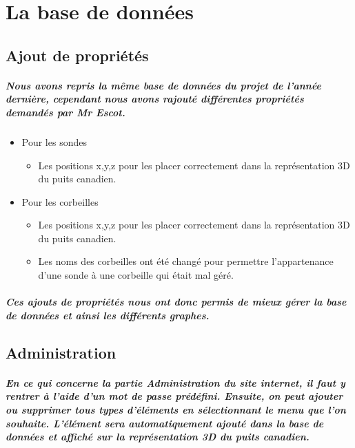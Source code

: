 \documentclass[12pt , a4paper,titlepage]{report}
\begin{document}
 \chapter{La base de données}
 \section{Ajout de propriétés}
 
 \paragraph{ Nous avons repris la même base de données du projet de l'année dernière, cependant nous avons rajouté différentes propriétés demandés 
par Mr Escot.}
	\begin{itemize}
		\item Pour les sondes
		\begin{itemize}
			\item Les positions x,y,z pour les placer correctement dans la représentation 3D du puits canadien.
		\end{itemize}
		\item Pour les corbeilles
		\begin{itemize}
			\item Les positions x,y,z pour les placer correctement dans la représentation 3D du puits canadien.
			\item Les noms des corbeilles ont été changé pour permettre l'appartenance d'une sonde à une corbeille qui était mal géré. 
		\end{itemize} 
	\end{itemize}
 \paragraph{   Ces ajouts de propriétés nous ont donc permis de mieux gérer la base de données et ainsi les différents graphes.  }
 \section{Administration}
	\paragraph{En ce qui concerne la partie Administration du site internet, il faut y rentrer à l'aide d'un mot de passe prédéfini. Ensuite, on
	peut ajouter ou supprimer tous types d'éléments en sélectionnant le menu que l'on souhaite. L'élément sera automatiquement ajouté dans la base 
	de données et affiché sur la représentation 3D du puits canadien.}
\end{document}
